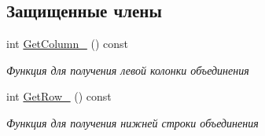 \subsection*{Защищенные члены}
\begin{DoxyCompactItemize}
\item 
int \hyperlink{classrtm_1_1_coating_union_a1d2b6a339f6cafbe41d416f371cbed04}{Get\+Column\+\_\+} () const
\begin{DoxyCompactList}\small\item\em Функция для получения левой колонки объединения \end{DoxyCompactList}\item 
int \hyperlink{classrtm_1_1_coating_union_ad283fd24e0c3347c569e3ea5772a9651}{Get\+Row\+\_\+} () const
\begin{DoxyCompactList}\small\item\em Функция для получения нижней строки объединения \end{DoxyCompactList}\end{DoxyCompactItemize}
